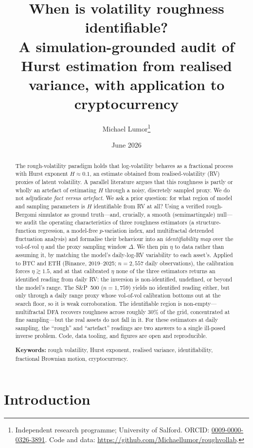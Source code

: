 \documentclass[11pt]{article}
\title{When is volatility roughness identifiable?\\
A simulation-grounded audit of Hurst estimation from realised variance,
with application to cryptocurrency}
\author{Michael Lumor\thanks{Independent research programme; University of
Salford. ORCID: \href{https://orcid.org/0009-0000-0326-3891}{0009-0000-0326-3891}.
Code and data: \url{https://github.com/Michaellumor/roughvollab}.}}
\date{June 2026}
\begin{document}
\maketitle

\begin{abstract}
The rough-volatility paradigm holds that log-volatility behaves as a fractional
process with Hurst exponent $H \approx 0.1$, an estimate obtained from
realised-volatility (RV) proxies of latent volatility. A parallel literature
argues that this roughness is partly or wholly an artefact of estimating $H$
through a noisy, discretely sampled proxy. We do not adjudicate \emph{fact versus
artefact}. We ask a prior question: for what region of model and sampling
parameters is $H$ identifiable from RV at all? Using a verified rough-Bergomi
simulator as ground truth---and, crucially, a smooth (semimartingale) null---we
audit the operating characteristics of three roughness estimators (a
structure-function regression, a model-free $p$-variation index, and multifractal
detrended fluctuation analysis) and formalise their behaviour into an
\emph{identifiability map} over the vol-of-vol $\eta$ and the proxy sampling
window $\Delta$. We then pin $\eta$ to data rather than assuming it, by matching
the model's daily-log-RV variability to each asset's. Applied to BTC and ETH
(Binance, 2019--2025; $n = 2{,}557$ daily observations), the calibration forces
$\eta \gtrsim 1.5$, and at that calibrated $\eta$ none of the three estimators
returns an identified reading from daily RV: the inversion is non-identified,
undefined, or beyond the model's range. The S\&P~500 ($n = 1{,}759$) yields no
identified reading either, but only through a daily range proxy whose vol-of-vol
calibration bottoms out at the search floor, so it is weak corroboration. The
identifiable region is non-empty---multifractal DFA recovers roughness across
roughly $30\%$ of the grid, concentrated at fine sampling---but the real assets
do not fall in it. For these estimators at daily sampling, the ``rough'' and
``artefact'' readings are two answers to a single ill-posed inverse problem.
Code, data tooling, and figures are open and reproducible.

\medskip
\noindent\textbf{Keywords:} rough volatility, Hurst exponent, realised variance,
identifiability, fractional Brownian motion, cryptocurrency.
\end{abstract}

\section{Introduction}
\end{document}
